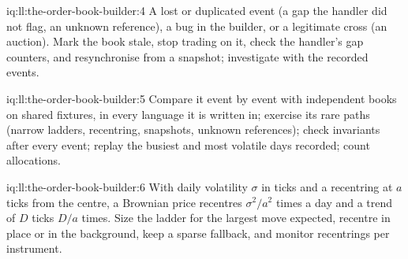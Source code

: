 \begin{solution}{iq:ll:the-order-book-builder:4}
A lost or duplicated event (a gap the handler did not flag, an unknown reference), a bug in the builder, or a legitimate cross
(an auction). Mark the book stale, stop trading on it, check the handler's gap counters, and resynchronise from a snapshot;
investigate with the recorded events.
\end{solution}

\begin{solution}{iq:ll:the-order-book-builder:5}
Compare it event by event with independent books on shared fixtures, in every language it is written in; exercise its rare
paths (narrow ladders, recentring, snapshots, unknown references); check invariants after every event; replay the busiest and
most volatile days recorded; count allocations.
\end{solution}

\begin{solution}{iq:ll:the-order-book-builder:6}
With daily volatility $\sigma$ in ticks and a recentring at $a$ ticks from the centre, a Brownian price recentres $\sigma^2/a^2$
times a day and a trend of $D$ ticks $D/a$ times. Size the ladder for the largest move expected, recentre in place or in the
background, keep a sparse fallback, and monitor recentrings per instrument.
\end{solution}
